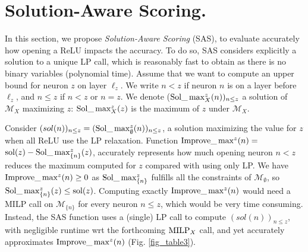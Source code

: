 \section{Solution-Aware Scoring.}

\label{sec4}

In this section, we propose {\em Solution-Aware Scoring} (SAS),
to evaluate accurately how opening a ReLU impacts the accuracy.
To do so, SAS considers explicitly a solution to a unique LP call, which is reasonably fast to obtain as there is no binary variables (polynomial time). 
Assume that we want to compute an upper bound for neuron $z$ on layer $\ell_z$.
We write $n < z$ if neuron $n$ is on a layer before $\ell_z$, and $n \leq z$ if $n< z$ or $n=z$. We denote ($\mathrm{Sol}\_\max_X^z(n))_{n \leq z}$ a solution of $\mathcal{M}_X$ maximizing $z$: $\mathrm{Sol}\_\max_X^z(z)$ is the maximum of $z$ under $\mathcal{M}_X$.

Consider $(sol(n))_{n \leq z} = (\mathrm{Sol}\_\max_\emptyset^z(n))_{n \leq z}$, a solution maximizing the value for $z$ when all ReLU use the LP relaxation.
Function
$\mathrm{Improve}\_\max^z(n)=$ $\mathrm{sol}(z) - \mathrm{Sol}\_\max_{\{n\}}^z(z)$, 
accurately represents how much opening neuron $n < z$ reduces the maximum computed for $z$
compared with using only LP. 
We have $\mathrm{Improve}\_\max^z(n)\geq 0$ as $\mathrm{Sol}\_\max_{\{n\}}^z$ fulfills all the constraints of 
$\mathcal{M}_\emptyset$, so $\mathrm{Sol}\_\max_{\{n\}}^z(z) \leq \mathrm{sol}(z)$.
Computing exactly $\mathrm{Improve}\_\max^z(n)$ would need a MILP call on $\mathcal{M}_{\{n\}}$ for every neuron $n \leq z$, which would be very time consuming. Instead, the SAS function uses a (single) LP call to compute $(sol(n))_{n \leq z}$, with negligible runtime wrt the forthcoming  ${\textrm{MILP}}_X$ call, and yet accurately approximates $\mathrm{Improve}\_\max^z(n)$ 
(Fig. \ref{fig_table3}).


\iffalse
That's why as far as we know, in competing heuristics to rank important nodes (e.g. \cite{BaB,huang2017safety,ferrari2022complete}), no call to solvers are made.
\fi





